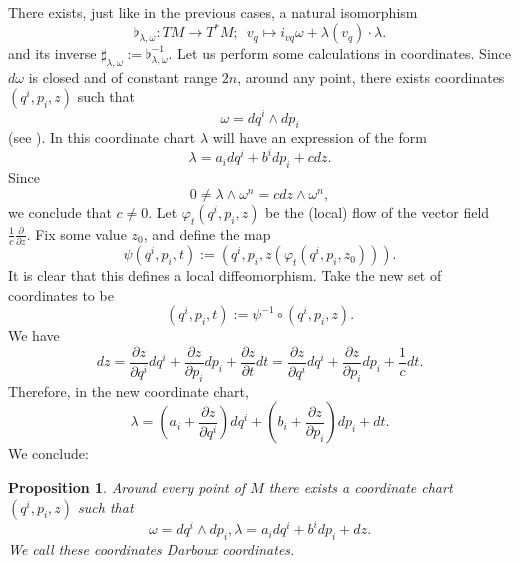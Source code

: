 \documentclass[12pt]{article}
\newtheorem{prop}{Proposition}[section]
\newcommand{\partder}[2]{\frac{\partial #1}{\partial #2}}
\begin{document}
There exists, just like in the previous cases, a natural isomorphism $$\flat_{\lambda, \omega}: TM \rightarrow T^*M;\,\,\,v_q \mapsto i_{vq} \omega + \lambda(v_q) \cdot \lambda.$$ and its inverse $\sharp_{\lambda, \omega} := \flat_{\lambda, \omega} ^{-1}.$ Let us perform some calculations in coordinates. Since $d\omega$ is closed and of constant range $2n$, around any point, there exists coordinates $(q^i, p_i, z)$ such that $$\omega = dq^i \wedge dp_i$$ (see \cites{godbillon1969geometrie}). In this coordinate chart $\lambda$ will have an expression of the form $$\lambda = a_i dq^i + b^i dp_i + c dz.$$ Since $$0 \neq \lambda \wedge \omega^n = c dz \wedge \omega^n,$$ we conclude that $c \neq 0$. Let $\varphi_t(q^i, p_i, z)$ be the (local) flow of the vector field $\displaystyle{\frac{1}{c} \partder{}{z}}$. Fix some value $z_0$, and define the map $$\psi(q^i, p_i, t) := (q^i, p_i, z(\varphi_t(q^i, p_i, z_0))).$$ It is clear that this defines a local diffeomorphism. Take the new set of coordinates to be $$(q^i, p_i, t) := \psi^{-1} \circ (q^i, p_i, z).$$ We have $$dz = \partder{z}{q^i} dq^i + \partder{z}{p_i} dp_i + \partder{z}{t} dt = \partder{z}{q^i} dq^i + \partder{z}{p_i} dp_i + \frac{1}{c} dt.$$ Therefore, in the new coordinate chart, $$\lambda = \left( a_i + \partder{z}{q^i}\right) dq^i + \left( b_i + \partder{z}{p_i}\right) dp_i + dt.$$ We conclude:

\begin{prop} Around every point of $M$ there exists a coordinate chart $(q^i, p_i, z)$ such that $$\omega = dq^i \wedge dp_i, \lambda = a_i dq^i + b^i dp_i + dz.$$ We call these coordinates Darboux coordinates.
\end{prop}
\end{document}
